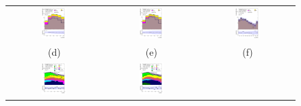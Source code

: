 \documentclass[PAPER, coverpage, atlasdraft=true, texlive=2016, UKenglish]{\ATLASLATEXPATH atlasdoc}
\begin{document}
\begin{figure}[H]
\begin{tabular}{@{}ccc@{}}
\includegraphics[page=1,width=0.28\textwidth]{figures/mtt/tuH_reg1l1tau1b2j_os_log_mtt.pdf}&
\includegraphics[page=1,width=0.28\textwidth]{figures/mtt/tuH_reg1l1tau1b3j_os_log_mtt.pdf}&
\includegraphics[page=1,width=0.28\textwidth]{figures/mtt/tuH_reg1l2tau1bnj_ss_log_mtt.pdf}\\
(d) & (e) & (f)\\
\includegraphics[page=1,width=0.28\textwidth]{figures/mtt/tuH_reg2mtau1b2jos_log_mtt.pdf}&
\includegraphics[page=1,width=0.28\textwidth]{figures/mtt/tuH_reg2mtau1b3jos_log_mtt.pdf}&

\end{tabular}
\end{figure}
\end{document}

